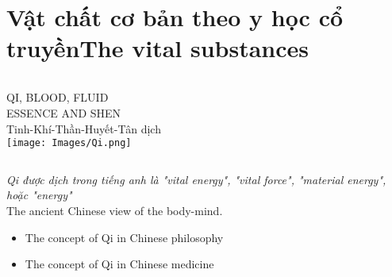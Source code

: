 \documentclass[
	11pt, %
]{beamer}
\theoremstyle{newblock}
\begin{document}
\section{Vật chất cơ bản theo y học cổ truyền\newline The vital substances}
\begin{frame}[plain]
	\begin{columns}[T]
		\Huge{QI, BLOOD, FLUID}\\
		\huge{ESSENCE AND SHEN}\\
		\Large{Tinh-Khí-Thần-Huyết-Tân dịch}\\
			\texttt{[image: Images/Qi.png]}	
	\end{columns}

	
	{\it Qi được dịch trong tiếng anh là "vital energy", "vital force", "material energy", hoặc "energy"}\\
	The ancient Chinese view of the body-mind.\\
	\begin{itemize}
		\item The concept of Qi in Chinese philosophy
		\item The concept of Qi in Chinese medicine
	\end{itemize}

\end{frame}
\end{document}
